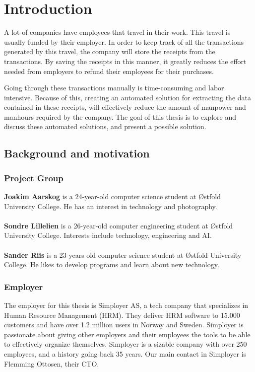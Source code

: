  \chapter{Introduction}
\label{ch:intro}
A lot of companies have employees that travel in their work.
This travel is usually funded by their employer.
In order to keep track of all the transactions generated by this travel, the company will store the receipts from the
transactions.
By saving the receipts in this manner, it greatly reduces the effort needed from employers to refund their employees
for their purchases.

Going through these transactions manually is time-consuming and labor intensive.
Because of this, creating an automated solution for extracting the data contained in these receipts, will effectively
reduce the amount of manpower and manhours required by the company.
The goal of this thesis is to explore and discuss these automated solutions, and present a possible solution.

\section{Background and motivation}\label{sec:background-and-motivation}
\subsection{Project Group}\label{subsec:project-group}
\textbf{Joakim Aarskog} is a 24-year-old computer science student at Østfold University College.
He has an interest in technology and photography.\\
\\
\textbf{Sondre Lillelien} is a 26-year-old computer engineering student at Østfold University College.
Interests include technology, engineering and AI.\\
\\
\textbf{Sander Riis} is a 23 years old computer science student at Østfold University College.
He likes to develop programs and learn about new technology.

\subsection{Employer}\label{subsec:employer}
The employer for this thesis is Simployer AS, a tech company that specializes in Human Resource Management (HRM).
They deliver HRM software to 15.000 customers and have over 1.2 million users in Norway and Sweden.
Simployer is passionate about giving other employers and their employees the tools to be able to effectively organize themselves.
Simployer is a sizable company with over 250 employees, and a history going back 35 years.
Our main contact in Simployer is Flemming Ottosen, their CTO.

